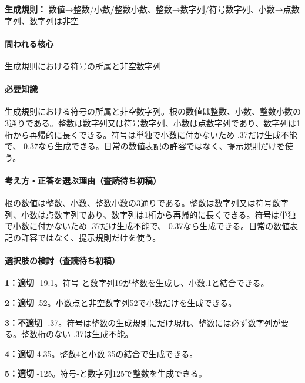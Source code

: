 \noindent\textbf{生成規則：} 数値→整数/小数/整数小数、整数→数字列/符号数字列、小数→点数字列、数字列は非空\par

\paragraph{問われる核心} 生成規則における符号の所属と非空数字列

\paragraph{必要知識} 生成規則における符号の所属と非空数字列。根の数値は整数、小数、整数小数の3通りである。整数は数字列又は符号数字列、小数は点数字列であり、数字列は1桁から再帰的に長くできる。符号は単独で小数に付かないため-.37だけ生成不能で、-0.37なら生成できる。日常の数値表記の許容ではなく、提示規則だけを使う。

\paragraph{考え方・正答を選ぶ理由（査読待ち初稿）} 根の数値は整数、小数、整数小数の3通りである。整数は数字列又は符号数字列、小数は点数字列であり、数字列は1桁から再帰的に長くできる。符号は単独で小数に付かないため-.37だけ生成不能で、-0.37なら生成できる。日常の数値表記の許容ではなく、提示規則だけを使う。

\paragraph{選択肢の検討（査読待ち初稿）}\mbox{}\par

\noindent\textbf{1：適切} -19.1。符号-と数字列19が整数を生成し、小数.1と結合できる。\par

\noindent\textbf{2：適切} .52。小数点と非空数字列52で小数だけを生成できる。\par

\noindent\textbf{3：不適切} -.37。符号は整数の生成規則にだけ現れ、整数には必ず数字列が要る。整数桁のない-.37は生成不能。\par

\noindent\textbf{4：適切} 4.35。整数4と小数.35の結合で生成できる。\par

\noindent\textbf{5：適切} -125。符号-と数字列125で整数を生成できる。\par

